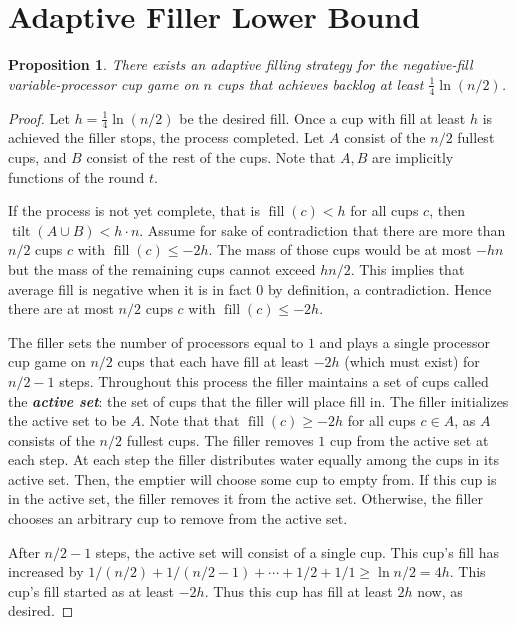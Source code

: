 \documentclass[twocolumn]{article}[10pt]
\newcommand{\defn}[1]{{\textit{\textbf{\boldmath #1}}}\xspace}
\DeclareMathOperator{\tilt}{\text{tilt}}
\DeclareMathOperator{\fil}{\text{fill}}
\newtheorem{proposition}{Proposition}
\begin{document}

\section{Adaptive Filler Lower Bound}\label{sec:adaptive}
\begin{proposition}
\label{prop:adaptiveBase}
  There exists an adaptive filling strategy for the negative-fill
  variable-processor cup game on $n$ cups that achieves backlog at least
  $\frac{1}{4}\ln (n/2)$.
\end{proposition}
\begin{proof}
  Let $h = \frac{1}{4}\ln (n/2)$ be the desired fill. Once a cup with fill at
  least $h$ is achieved the filler stops, the process completed.  
  Let $A$ consist of the $n/2$ fullest cups, and $B$ consist of the rest of the
  cups. Note that $A, B$ are implicitly functions of the round $t$.

  If the process is not yet complete, that is $\fil(c) < h$ for all cups $c$,
  then $\tilt(A\cup B) < h\cdot n$. Assume for sake of contradiction that there
  are more than $n/2$ cups $c$ with $\fil(c) \le -2h$. The mass of those cups
  would be at most $-hn$ but the mass of the remaining cups cannot exceed
  $hn/2$. This implies that average fill is negative when it is in fact $0$ by
  definition, a contradiction. Hence there are at most $n/2$ cups $c$ with
  $\fil(c) \le -2h$. 

  The filler sets the number of processors equal to $1$ and plays a single
  processor cup game on $n/2$ cups that each have fill at least $-2h$ (which
  must exist) for $n/2 -1$ steps. Throughout this process the filler maintains
  a set of cups called the \defn{active set}: the set of cups that the filler
  will place fill in. The filler initializes the active set to be $A$. Note
  that that $\fil(c) \ge -2h$ for all cups $c\in A$, as $A$ consists of the
  $n/2$ fullest cups. The filler removes $1$ cup from the active set at each
  step. At each step the filler distributes water equally among the cups in its
  active set. Then, the emptier will choose some cup to empty from. If this cup
  is in the active set, the filler removes it from the active set. Otherwise,
  the filler chooses an arbitrary cup to remove from the active set.

  After $n/2-1$ steps, the active set will consist of a single cup. This cup's
  fill has increased by $1/(n/2) + 1/(n/2 - 1) + \cdots + 1/2 + 1/1 \ge \ln n/2
  = 4h$. This cup's fill started as at least $-2h$. Thus this cup has fill at
  least $2h$ now, as desired.
\end{proof}
\end{document}
